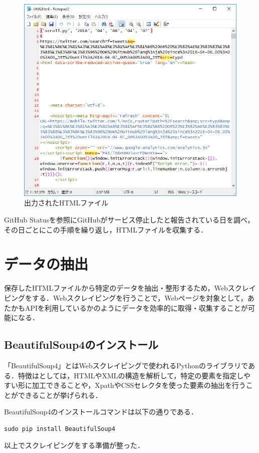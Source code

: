 \begin{figure}[htb]
\centering
\includegraphics[width=13cm]{img/html.png}
\caption{出力されたHTMLファイル}
\end{figure}

GitHub Statusを参照にGitHubがサービス停止したと報告されている日を調べ，その日ごとにこの手順を繰り返し，HTMLファイルを収集する．

\newpage
\section{データの抽出}
保存したHTMLファイルから特定のデータを抽出・整形するため，Webスクレイピングをする．Webスクレイピングを行うことで，Webページを対象として，あたかもAPIを利用しているかのようにデータを効率的に取得・収集することが可能になる．
\subsection{BeautifulSoup4のインストール}
「BeautifulSoup4」とはWebスクレイピングで使われるPythonのライブラリである．特徴はとしては，HTMLやXMLの構造を解析して，特定の要素を指定しやすい形に加工できることや，XpathやCSSセレクタを使った要素の抽出を行うことができることが挙げられる．

BeautifulSoup4のインストールコマンドは以下の通りである．
\begin{lstlisting}[basicstyle=\ttfamily\footnotesize, frame=single]
sudo pip install BeautifulSoup4
\end{lstlisting}
以上でスクレイピングをする準備が整った．

